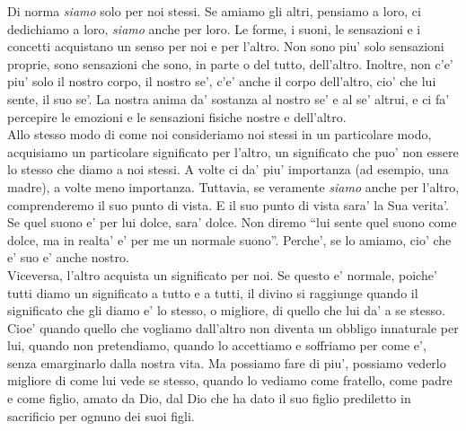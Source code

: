 Di norma \emph{siamo} solo per noi stessi. Se amiamo gli altri, pensiamo a loro, ci dedichiamo a loro, \emph{siamo} anche per loro. Le forme, i suoni, le sensazioni e i concetti acquistano un senso per noi e per l'altro. Non sono piu' solo sensazioni proprie, sono sensazioni che sono, in parte o del tutto, dell'altro. Inoltre, non c'e' piu' solo il nostro corpo, il nostro se', c'e' anche il corpo dell'altro, cio' che lui sente, il suo se'. La nostra anima da' sostanza al nostro se' e al se' altrui, e ci fa' percepire le emozioni e le sensazioni fisiche nostre e dell'altro. \\
Allo stesso modo di come noi consideriamo noi stessi in un particolare modo, acquisiamo un particolare significato per l'altro, un significato che puo' non essere lo stesso che diamo a noi stessi. A volte ci da' piu' importanza (ad esempio, una madre), a volte meno importanza. Tuttavia, se veramente \emph{siamo} anche per l'altro, comprenderemo il suo punto di vista. E il suo punto di vista sara' la Sua verita'. Se quel suono e' per lui dolce, sara' dolce. Non diremo ``lui sente quel suono come dolce, ma in realta' e' per me un normale suono''. Perche', se lo amiamo, cio' che e' suo e' anche nostro.\\
Viceversa, l'altro acquista un significato per noi. Se questo e' normale, poiche' tutti diamo un significato a tutto e a tutti, il divino si raggiunge quando il significato che gli diamo e' lo stesso, o migliore, di quello che lui da' a se stesso. Cioe' quando quello che vogliamo dall'altro non diventa un obbligo innaturale per lui, quando non pretendiamo, quando lo accettiamo e soffriamo per come e', senza emarginarlo dalla nostra vita. Ma possiamo fare di piu', possiamo vederlo migliore di come lui vede se stesso, quando lo vediamo come fratello, come padre e come figlio, amato da Dio, dal Dio che ha dato il suo figlio prediletto in sacrificio per ognuno dei suoi figli.

